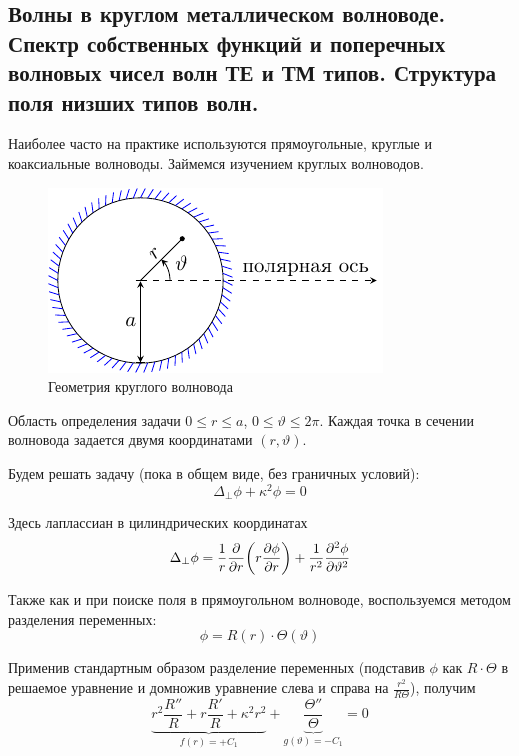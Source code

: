 \subsection{Волны в круглом металлическом волноводе. Спектр собственных функций и поперечных волновых чисел волн ТЕ и ТМ типов. Структура поля низших типов волн.}


Наиболее часто на практике используются прямоугольные, круглые и коаксиальные волноводы. Займемся изучением круглых волноводов.

\begin{figure}[ht]
	\centering
	\includegraphics[scale=1.65]{img_lect5/cylindric/geometry}
	\caption{Геометрия круглого волновода}
	\label{fig:cylinder:geometry}
\end{figure}

Область определения задачи $0\leq r \leq a$, $0\leq \vartheta \leq 2\pi$. Каждая точка в сечении волновода задается двумя координатами $(r,\vartheta)$.

Будем решать задачу (пока в общем виде, без граничных условий):
\begin{equation}
	\Delta_\perp \phi+\kappa^2\phi=0
\end{equation}

Здесь лаплассиан в цилиндрических координатах
\begin{equation}
	\Delta_\perp\phi=\frac{1}{r}\pdv{r}\qty(r\pdv{\phi}{r})+\frac{1}{r^2}\pdv[2]{\phi}{\vartheta}
\end{equation}

Также как и при поиске поля в прямоугольном волноводе, воспользуемся методом разделения переменных:
\begin{equation}
	\phi=R(r)\cdot\Theta(\vartheta)
\end{equation}

Применив стандартным образом разделение переменных (подставив $\phi$ как $R\cdot\Theta$ в решаемое уравнение и домножив уравнение слева и справа на $\frac{r^2}{R\Theta}$), получим
\begin{equation}
	\underbrace{r^2\frac{R''}{R}+r\frac{R'}{R}+\kappa^2r^2}_{f(r)=+C_1}+
	\underbrace{\frac{\Theta''}{\Theta}}_{g(\vartheta)=-C_1}
	=0
\end{equation}

